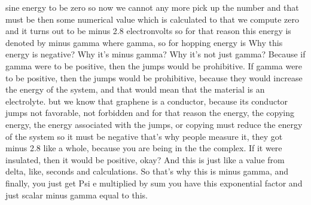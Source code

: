 sine energy to be zero so now we cannot any more pick up the number and that must be then some numerical value which is calculated to that we compute zero and it turns out to be minus 2.8 electronvolts so for that reason this energy is denoted by minus gamma where gamma, so for hopping energy is Why this energy is negative? Why it's minus gamma? Why it's not just gamma? Because if gamma were to be positive, then the jumps would be prohibitive. If gamma were to be positive, then the jumps would be prohibitive, because they would increase the energy of the system, and that would mean that the material is an electrolyte. but we know that graphene is a conductor, because its conductor jumps not favorable, not forbidden and for that reason the energy, the copying energy, the energy associated with the jumps, or copying must reduce the energy of the system so it must be negative that's why people measure it, they got minus 2.8 like a whole, because you are being in the the complex. If it were insulated, then it would be positive, okay? And this is just like a value from delta, like, seconds and calculations. So that's why this is minus gamma, and finally, you just get Psi e multiplied by sum you have this exponential factor and just scalar minus gamma equal to this.
